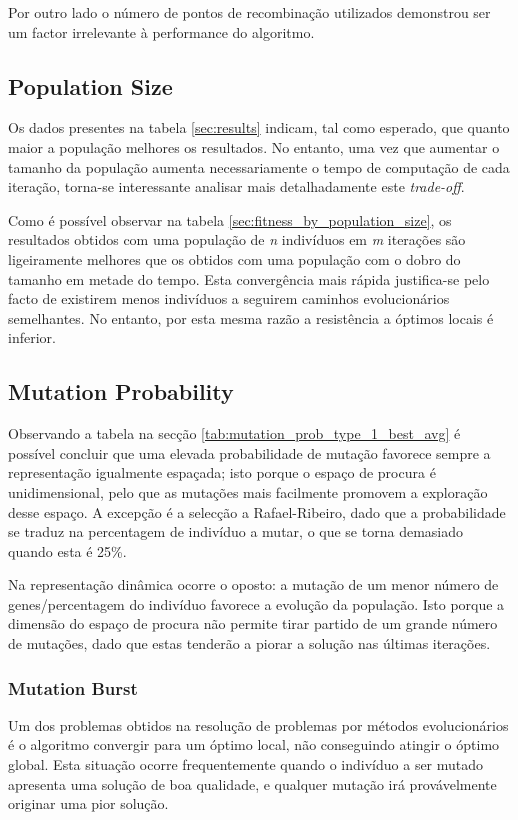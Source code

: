 \documentclass[a4paper]{article}
\begin{document}
\indent Por outro lado o número de pontos de recombinação utilizados demonstrou ser um factor irrelevante à performance do algoritmo.

\cleardoublepage
\subsection{Population Size}
\indent \indent Os dados presentes na tabela \ref{sec:results} indicam, tal como esperado, que quanto maior a população melhores
os resultados. No entanto, uma vez que aumentar o tamanho da população aumenta necessariamente
o tempo de computação de cada iteração, torna-se interessante analisar mais detalhadamente este \emph{trade-off}.

\indent Como é possível observar na tabela \ref{sec:fitness_by_population_size}, os resultados obtidos com uma
população de \emph{n} indivíduos em \emph{m} iterações são ligeiramente melhores que os obtidos
com uma população com o dobro do tamanho em metade do tempo. Esta convergência mais rápida justifica-se
pelo facto de existirem menos indivíduos a seguirem caminhos evolucionários semelhantes. No entanto, por esta
mesma razão a resistência a óptimos locais é inferior.
 
\cleardoublepage

\subsection{Mutation Probability}
\indent \indent Observando a tabela na secção \ref{tab:mutation_prob_type_1_best_avg} é possível concluir que uma elevada probabilidade de mutação favorece sempre
a representação igualmente espaçada; isto porque o espaço de procura é unidimensional, pelo que as mutações mais facilmente promovem a exploração desse espaço.
A excepção é a selecção a Rafael-Ribeiro, dado que a probabilidade se traduz na percentagem de indivíduo a mutar, o que se torna demasiado quando esta é 25\%.

Na representação dinâmica ocorre o oposto: a mutação de um menor número de genes/percentagem do indivíduo favorece a evolução da população. Isto porque a dimensão
do espaço de procura não permite tirar partido de um grande número de mutações, dado que estas tenderão a piorar a solução nas últimas iterações.

\subsubsection{Mutation Burst}
\indent \indent Um dos problemas obtidos na resolução de problemas por métodos evolucionários é o algoritmo
convergir para um óptimo local, não conseguindo atingir o óptimo global. Esta situação ocorre frequentemente
quando o indivíduo a ser mutado apresenta uma solução de boa qualidade, e qualquer mutação irá provávelmente originar
uma pior solução.
\end{document}
